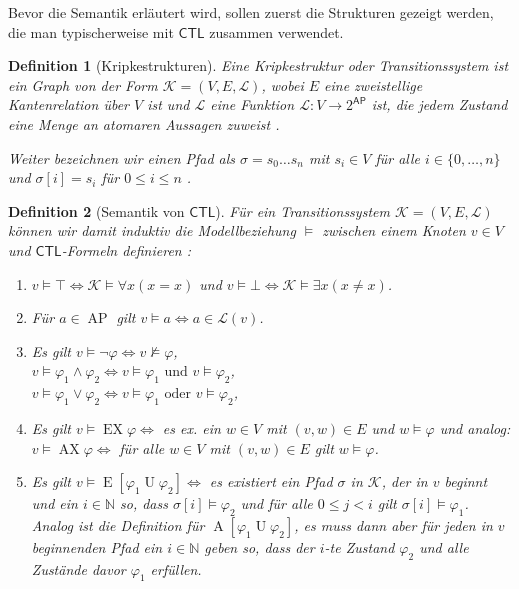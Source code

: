 \documentclass{lni}
\theoremstyle{def_style}
\newtheorem{definition}{Definition}[section]
\theoremstyle{break}
\newcommand{\AU}[2]{\operatorname{A}[#1\operatorname{U}#2]}
\newcommand{\EU}[2]{\operatorname{E}[#1\operatorname{U}#2]}
\newcommand{\CTL}{\mathsf{CTL}}
\begin{document}
Bevor die Semantik erläutert wird, sollen zuerst die Strukturen gezeigt werden, die man typischerweise mit $\CTL$ zusammen verwendet.

\begin{definition}[Kripkestrukturen]
	Eine \textit{Kripkestruktur} oder \textit{Transitionssystem} ist ein Graph von der Form $\mathcal{K}=(V, E, \mathcal{L})$, wobei $E$ eine zweistellige Kantenrelation über $V$ ist und $\mathcal{L}$ eine Funktion $\mathcal{L}:V\to2^{\mathsf{AP}}$ ist, die jedem Zustand eine Menge an atomaren Aussagen zuweist 	\cite{clarke1982design,clarke1986automatic}.
	
	Weiter bezeichnen wir einen Pfad als $\sigma=s_0\dots s_n$ mit $s_i\in V$ für alle $i\in\{0,\dots,n\}$ und $\sigma[i]=s_i$ für $0\leq i \leq n$ \cite{baier2008principles}.
\end{definition}

\begin{definition}[Semantik von $\CTL$]
	Für ein Transitionssystem $\mathcal{K}=(V,E,\mathcal{L})$ können wir damit induktiv die Modellbeziehung $\models$ zwischen einem Knoten $v\in V$ und $\CTL$-Formeln definieren \cite{baier2008principles}:
	\begin{enumerate}
		\item $v\models \top \Leftrightarrow \mathcal{K}\models\forall x(x=x)$ und $v\models \bot \Leftrightarrow \mathcal{K}\models\exists x(x\neq x)$.
		\item Für $a\in \operatorname{AP}$ gilt $v\models a \Leftrightarrow a\in \mathcal{L}(v)$.
		\item Es gilt $v\models \neg \varphi \Leftrightarrow v\not\models \varphi$,\\
		$v\models \varphi_1 \land \varphi_2 \Leftrightarrow v\models \varphi_1 \text{ und } v\models \varphi_2$,\\
		$v\models \varphi_1 \lor \varphi_2 \Leftrightarrow v\models \varphi_1 \text{ oder } v\models \varphi_2$,
		\item Es gilt $v\models \operatorname{EX}\varphi \Leftrightarrow$ es ex. ein $w\in V$ mit $(v,w)\in E$ und $w\models \varphi$ und analog:\\ 
		$v\models \operatorname{AX}\varphi \Leftrightarrow$ für alle $w\in V$ mit $(v,w)\in E$ gilt $w\models \varphi$.
		\item Es gilt $v\models \EU{\varphi_1}{\varphi_2} \Leftrightarrow$ es existiert ein Pfad $\sigma$ in $\mathcal{K}$, der in $v$ beginnt und ein $i\in \mathbb{N}$ so, dass $\sigma[i]\models \varphi_2$ und für alle $0\leq j < i$ gilt $\sigma[i]\models \varphi_1$. 
		Analog ist die Definition für $\AU{\varphi_1}{\varphi_2}$, es muss dann aber für jeden in $v$ beginnenden Pfad ein $i\in \mathbb{N}$ geben so, dass der $i$-te Zustand $\varphi_2$ und alle Zustände davor $\varphi_1$ erfüllen.
	\end{enumerate}
\end{definition}
\end{document}
